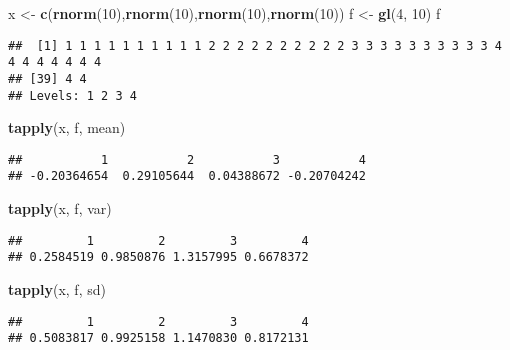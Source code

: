 \documentclass[
]{article}
\newenvironment{Shaded}{\begin{snugshade}}{\end{snugshade}}
\newcommand{\DecValTok}[1]{\textcolor[rgb]{0.00,0.00,0.81}{#1}}
\newcommand{\FunctionTok}[1]{\textcolor[rgb]{0.13,0.29,0.53}{\textbf{#1}}}
\newcommand{\NormalTok}[1]{#1}
\newcommand{\OtherTok}[1]{\textcolor[rgb]{0.56,0.35,0.01}{#1}}
\begin{document}
\begin{Shaded}
\begin{Highlighting}[]
\NormalTok{x }\OtherTok{\textless{}{-}} \FunctionTok{c}\NormalTok{(}\FunctionTok{rnorm}\NormalTok{(}\DecValTok{10}\NormalTok{),}\FunctionTok{rnorm}\NormalTok{(}\DecValTok{10}\NormalTok{),}\FunctionTok{rnorm}\NormalTok{(}\DecValTok{10}\NormalTok{),}\FunctionTok{rnorm}\NormalTok{(}\DecValTok{10}\NormalTok{))}
\NormalTok{f }\OtherTok{\textless{}{-}} \FunctionTok{gl}\NormalTok{(}\DecValTok{4}\NormalTok{, }\DecValTok{10}\NormalTok{)}
\NormalTok{f}
\end{Highlighting}
\end{Shaded}

\begin{verbatim}
##  [1] 1 1 1 1 1 1 1 1 1 1 2 2 2 2 2 2 2 2 2 2 3 3 3 3 3 3 3 3 3 3 4 4 4 4 4 4 4 4
## [39] 4 4
## Levels: 1 2 3 4
\end{verbatim}

\begin{Shaded}
\begin{Highlighting}[]
\FunctionTok{tapply}\NormalTok{(x, f, mean)}
\end{Highlighting}
\end{Shaded}

\begin{verbatim}
##           1           2           3           4 
## -0.20364654  0.29105644  0.04388672 -0.20704242
\end{verbatim}

\begin{Shaded}
\begin{Highlighting}[]
\FunctionTok{tapply}\NormalTok{(x, f, var)}
\end{Highlighting}
\end{Shaded}

\begin{verbatim}
##         1         2         3         4 
## 0.2584519 0.9850876 1.3157995 0.6678372
\end{verbatim}

\begin{Shaded}
\begin{Highlighting}[]
\FunctionTok{tapply}\NormalTok{(x, f, sd)}
\end{Highlighting}
\end{Shaded}

\begin{verbatim}
##         1         2         3         4 
## 0.5083817 0.9925158 1.1470830 0.8172131
\end{verbatim}
\end{document}
